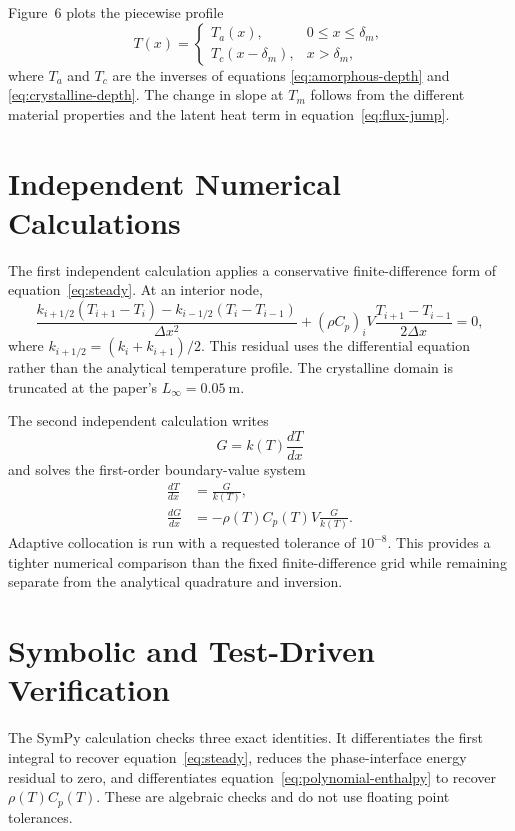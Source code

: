 \documentclass[11pt]{article}
\begin{document}
Figure~6 plots the piecewise profile
\begin{equation}
 T(x)=
 \begin{cases}
  T_a(x), & 0\leq x\leq\delta_m,\\
  T_c(x-\delta_m), & x>\delta_m,
 \end{cases}
 \label{eq:piecewise-profile}
\end{equation}
where $T_a$ and $T_c$ are the inverses of equations
\eqref{eq:amorphous-depth} and \eqref{eq:crystalline-depth}. The change in
slope at $T_m$ follows from the different material properties and the latent
heat term in equation~\eqref{eq:flux-jump}.

\section{Independent Numerical Calculations}
The first independent calculation applies a conservative finite-difference
form of equation~\eqref{eq:steady}. At an interior node,
\begin{equation}
 \frac{k_{i+1/2}(T_{i+1}-T_i)-k_{i-1/2}(T_i-T_{i-1})}{\Delta x^2}
 +(\rho C_p)_iV\frac{T_{i+1}-T_{i-1}}{2\Delta x}=0,
 \label{eq:finite-difference}
\end{equation}
where $k_{i+1/2}=(k_i+k_{i+1})/2$. This residual uses the differential
equation rather than the analytical temperature profile. The crystalline
domain is truncated at the paper's $L_\infty=0.05\ \mathrm{m}$.

The second independent calculation writes
\begin{equation}
 G=k(T)\frac{dT}{dx}
\end{equation}
and solves the first-order boundary-value system
\begin{align}
 \frac{dT}{dx}&=\frac{G}{k(T)},\\
 \frac{dG}{dx}&=-\rho(T)C_p(T)V\frac{G}{k(T)}.
 \label{eq:bvp-system}
\end{align}
Adaptive collocation is run with a requested tolerance of $10^{-8}$. This
provides a tighter numerical comparison than the fixed finite-difference grid
while remaining separate from the analytical quadrature and inversion.

\section{Symbolic and Test-Driven Verification}
The SymPy calculation checks three exact identities. It differentiates the
first integral to recover equation~\eqref{eq:steady}, reduces the phase-interface
energy residual to zero, and differentiates equation~\eqref{eq:polynomial-enthalpy}
to recover $\rho(T)C_p(T)$. These are algebraic checks and do not use floating
point tolerances.
\end{document}
